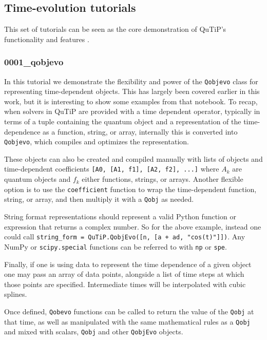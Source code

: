 \documentclass[preprint,3p,sort&compress]{elsarticle}
\def\code#1{\texttt{#1}}
\newcommand{\nocontentsline}[3]{}
\newcommand{\tocless}[2]{\bgroup\let\addcontentsline=\nocontentsline#1{#2}\egroup}
\begin{document}
\subsection{Time-evolution tutorials}

This set of tutorials can be seen as the core demonstration of QuTiP's functionality and features \cite{tutorials}.
\tocless\subsubsection{0001\_qobjevo}

In this tutorial we demonstrate the flexibility and power of the \code{Qobjevo} class for representing time-dependent objects.  This has largely been covered earlier in this work, but it is interesting to show some examples from that notebook.  To recap, when solvers in QuTiP are provided with a time dependent operator, typically in terms of a tuple containing the quantum object and a representation of the time-dependence as a function, string, or array, internally this is converted into \code{Qobjevo}, which compiles and optimizes the representation.

These objects can also be created and compiled manually with lists of objects and time-dependent coefficients
\code{[A0, [A1, f1], [A2, f2], ...]} where $A_k$ are quantum objects and $f_k$ either functions, strings, or arrays. Another flexible option is to use the \code{coefficient} function to wrap the time-dependent function, string, or array, and then multiply it with a \code{Qobj} as needed.



String format representations should represent a valid Python function or expression that returns a complex number.  So for the above example, instead one could call \code{string\_form = QuTiP.QobjEvo([n, [a + ad, "cos(t)"]])}. Any NumPy or \code{scipy.special} functions can be referred to with \code{np} or \code{spe}.

Finally, if one is using data to represent the time dependence of a given object one may pass an array of data points, alongside a list of time steps at which those points are specified. Intermediate times will be interpolated with cubic splines.



Once defined, \code{Qobevo} functions can be called to return the value of the \code{Qobj} at that time, as well as manipulated with the same mathematical rules as a \code{Qobj} and mixed with scalars, \code{Qobj} and other \code{QobjEvo} objects. 
\end{document}
